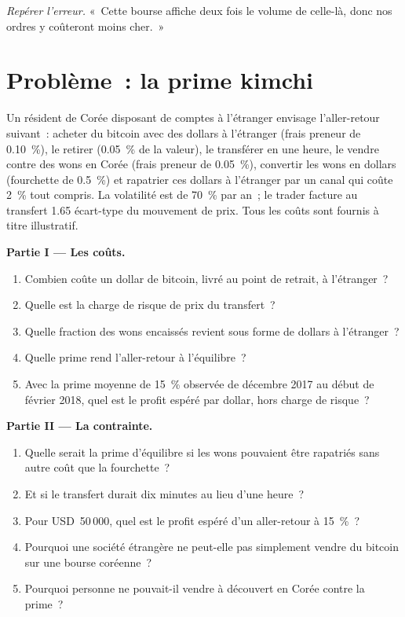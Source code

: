 \begin{exercise}[$\star\star\star$]\label{exo:m3:spot-markets:8}
\emph{Repérer l'erreur.} «~Cette bourse affiche deux fois le volume de celle-là, donc nos ordres y coûteront moins cher.~»
\end{exercise}

\section{Problème~: la prime kimchi}

\begin{problem}\label{pb:m3:spot-markets:1}
Un résident de Corée disposant de comptes à l'étranger envisage l'aller-retour suivant~: acheter du bitcoin avec des dollars à l'étranger (frais
preneur de 0.10~\%), le retirer (0.05~\% de la valeur), le transférer en une heure, le vendre contre des wons en Corée (frais preneur de 0.05~\%), convertir
les wons en dollars (fourchette de 0.5~\%) et rapatrier ces dollars à l'étranger par un canal qui coûte 2~\% tout compris. La volatilité est de 70~\%
par an~; le trader facture au transfert 1.65 écart-type du mouvement de prix. Tous les coûts sont fournis à titre illustratif.

\medskip\noindent\textbf{Partie I --- Les coûts.}
\begin{enumerate}
\item Combien coûte un dollar de bitcoin, livré au point de retrait, à l'étranger~?
\item Quelle est la charge de risque de prix du transfert~?
\item Quelle fraction des wons encaissés revient sous forme de dollars à l'étranger~?
\item Quelle prime rend l'aller-retour à l'équilibre~?
\item Avec la prime moyenne de 15~\% observée de décembre 2017 au début de février 2018, quel est le profit espéré par dollar,
hors charge de risque~?
\end{enumerate}

\medskip\noindent\textbf{Partie II --- La contrainte.}
\begin{enumerate}[resume]
\item Quelle serait la prime d'équilibre si les wons pouvaient être rapatriés sans autre coût que la fourchette~?
\item Et si le transfert durait dix minutes au lieu d'une heure~?
\item Pour USD~50\,000, quel est le profit espéré d'un aller-retour à 15~\%~?
\item Pourquoi une société étrangère ne peut-elle pas simplement vendre du bitcoin sur une bourse coréenne~?
\item Pourquoi personne ne pouvait-il vendre à découvert en Corée contre la prime~?
\end{enumerate}


\end{problem}
